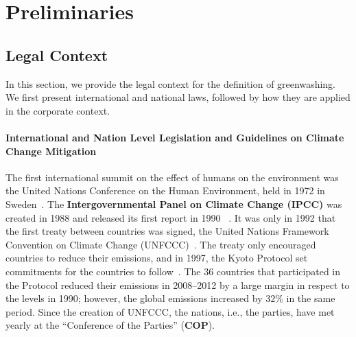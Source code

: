 \section{Preliminaries} %
\label{sec:definitions}

\subsection{Legal Context}
In this section, we provide the legal context for the definition of greenwashing. 
We first present international and national laws, followed by how they are applied in the corporate context. 


\paragraph{International and Nation Level Legislation and Guidelines on Climate Change Mitigation}
The first international summit on the effect of humans on the environment was the United Nations Conference on the Human Environment, held in 1972 in Sweden~\cite{timelineclimate}. The \textbf{Intergovernmental Panel on Climate Change (IPCC)} was created in 1988 and released its first report in 1990 ~\cite{change1990ipcc}. It was only in 1992 that the first treaty between countries was signed, the United Nations Framework Convention on Climate Change (UNFCCC)~\cite{timelineclimate}. The treaty only encouraged countries to reduce their emissions, and in 1997, the Kyoto Protocol set commitments for the countries to follow~\cite{kyotoprotocol}. The 36 countries that participated in the Protocol reduced their emissions in 2008–2012 by a large margin in respect to the levels in 1990; however, the global emissions increased by $32\%$ in the same period. 
Since the creation of UNFCCC, the nations, i.e., the parties, have met yearly at the ``Conference of the Parties'' (\textbf{COP}). 

